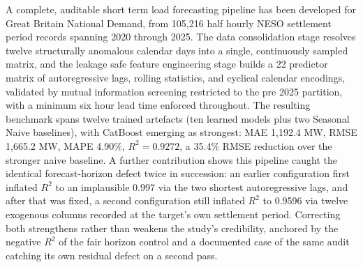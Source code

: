 \documentclass[runningheads]{llncs}
\begin{document}
A complete, auditable short term load forecasting pipeline has been developed for Great Britain National Demand, from 105{,}216 half hourly NESO settlement period records spanning 2020 through 2025. The data consolidation stage resolves twelve structurally anomalous calendar days into a single, continuously sampled matrix, and the leakage safe feature engineering stage builds a 22 predictor matrix of autoregressive lags, rolling statistics, and cyclical calendar encodings, validated by mutual information screening restricted to the pre 2025 partition, with a minimum six hour lead time enforced throughout. The resulting benchmark spans twelve trained artefacts (ten learned models plus two Seasonal Naive baselines), with CatBoost emerging as strongest: MAE 1{,}192.4 MW, RMSE 1{,}665.2 MW, MAPE 4.90\%, $R^2=0.9272$, a 35.4\% RMSE reduction over the stronger naive baseline. A further contribution shows this pipeline caught the identical forecast-horizon defect twice in succession: an earlier configuration first inflated $R^2$ to an implausible 0.997 via the two shortest autoregressive lags, and after that was fixed, a second configuration still inflated $R^2$ to 0.9596 via twelve exogenous columns recorded at the target's own settlement period. Correcting both strengthens rather than weakens the study's credibility, anchored by the negative $R^2$ of the fair horizon control and a documented case of the same audit catching its own residual defect on a second pass.
\end{document}
